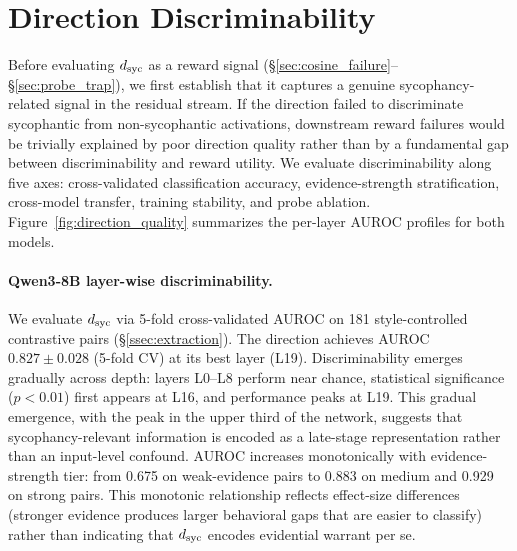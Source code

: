 \section{Direction Discriminability}
\label{sec:direction_quality}

Before evaluating $d_{\text{syc}}$ as a reward signal (\S\ref{sec:cosine_failure}--\S\ref{sec:probe_trap}), we first establish that it captures a genuine sycophancy-related signal in the residual stream.
If the direction failed to discriminate sycophantic from non-sycophantic activations, downstream reward failures would be trivially explained by poor direction quality rather than by a fundamental gap between discriminability and reward utility.
We evaluate discriminability along five axes: cross-validated classification accuracy, evidence-strength stratification, cross-model transfer, training stability, and probe ablation.
Figure~\ref{fig:direction_quality} summarizes the per-layer AUROC profiles for both models.

\paragraph{Qwen3-8B layer-wise discriminability.}
We evaluate $d_{\text{syc}}$ via 5-fold cross-validated AUROC on 181 style-controlled contrastive pairs (\S\ref{ssec:extraction}).
The direction achieves AUROC $0.827 \pm 0.028$ (5-fold CV) at its best layer (L19).
Discriminability emerges gradually across depth: layers L0--L8 perform near chance, statistical significance ($p < 0.01$) first appears at L16, and performance peaks at L19.
This gradual emergence, with the peak in the upper third of the network, suggests that sycophancy-relevant information is encoded as a late-stage representation rather than an input-level confound.
AUROC increases monotonically with evidence-strength tier: from 0.675 on weak-evidence pairs to 0.883 on medium and 0.929 on strong pairs.
This monotonic relationship reflects effect-size differences (stronger evidence produces larger behavioral gaps that are easier to classify) rather than indicating that $d_{\text{syc}}$ encodes evidential warrant per se.

